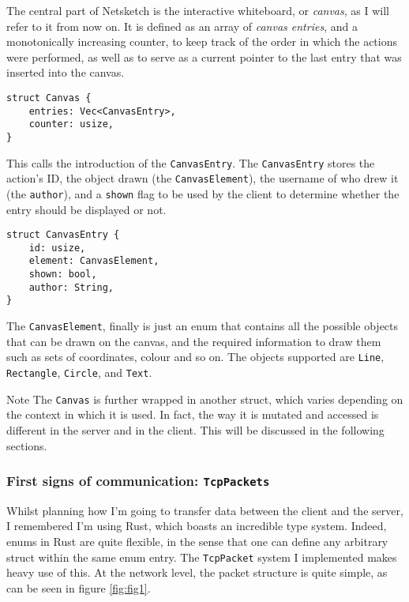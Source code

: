 \documentclass{article}
\newcommand{\code}[1]{\texttt{#1}}
\begin{document}
The central part of Netsketch is the interactive whiteboard, or \textit{canvas}, as I will
refer to it from now on. It is defined as an array of \textit{canvas entries},
and a monotonically increasing counter, to keep track of the order in which the
actions were performed, as well as to serve as a current pointer to the last
entry that was inserted into the canvas.

\begin{subbox}{}
    \begin{lstlisting}
struct Canvas {
    entries: Vec<CanvasEntry>,
    counter: usize,
}
        \end{lstlisting}
\end{subbox}

This calls the introduction of the \code{CanvasEntry}. The \code{CanvasEntry} stores the action's ID, the object drawn (the \code{CanvasElement}), the username of who drew it (the \code{author}), and a \code{shown} flag to be used by the client to determine whether the entry should be displayed or not.


\begin{subbox}{}
    \begin{lstlisting}
struct CanvasEntry {
    id: usize,
    element: CanvasElement,
    shown: bool,
    author: String,
}
\end{lstlisting}
\end{subbox}

The \code{CanvasElement}, finally is just an enum that contains all the possible objects that can be drawn on the canvas, and the required information to draw them such as sets of coordinates, colour and so on. The objects supported are \code{Line}, \code{Rectangle}, \code{Circle}, and \code{Text}.

\vspace{1em}

\begin{mainbox}{Note}
    The \code{Canvas} is further wrapped in another struct, which varies depending on the context in which it is used. In fact, the way it is mutated and accessed is different in the server and in the client. This will be discussed in the following sections.
\end{mainbox}

\newpage

\subsubsection{First signs of communication: \code{TcpPackets}}
Whilst planning how I'm going to transfer data between the client and the
server, I remembered I'm using Rust, which boasts an incredible type system. Indeed, enums in Rust are quite flexible, in the sense that one can define any arbitrary struct within the same enum entry. The \code{TcpPacket} system I implemented makes heavy use of this. At the network level, the packet structure is quite simple, as can be seen in figure \ref{fig:fig1}.
\end{document}
